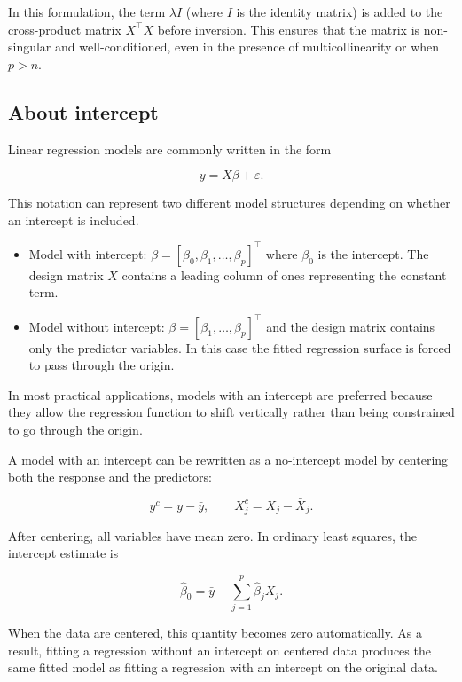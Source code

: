 \documentclass[
  letterpaper,
  DIV=11,
  numbers=noendperiod]{scrreprt}
\providecommand{\tightlist}{%
  \setlength{\itemsep}{0pt}\setlength{\parskip}{0pt}}
\theoremstyle{definition}
\theoremstyle{definition}
\theoremstyle{plain}
\theoremstyle{plain}
\theoremstyle{remark}
\begin{document}
In this formulation, the term \(\lambda I\) (where \(I\) is the identity
matrix) is added to the cross-product matrix \(X^\top X\) before
inversion. This ensures that the matrix is non-singular and
well-conditioned, even in the presence of multicollinearity or when
\(p > n\).

\subsection{About intercept}\label{about-intercept}

Linear regression models are commonly written in the form

\[
y = X\beta + \varepsilon.
\]

This notation can represent two different model structures depending on
whether an intercept is included.

\begin{itemize}
\tightlist
\item
  Model with intercept:
  \(\beta = [\beta_0,\beta_1,\ldots,\beta_p]^\top\) where \(\beta_0\) is
  the intercept. The design matrix \(X\) contains a leading column of
  ones representing the constant term.
\item
  Model without intercept: \(\beta = [\beta_1,\ldots,\beta_p]^\top\) and
  the design matrix contains only the predictor variables. In this case
  the fitted regression surface is forced to pass through the origin.
\end{itemize}

In most practical applications, models with an intercept are preferred
because they allow the regression function to shift vertically rather
than being constrained to go through the origin.

\begin{tcolorbox}[enhanced jigsaw, arc=.35mm, bottomrule=.15mm, bottomtitle=1mm, breakable, colback=white, colbacktitle=quarto-callout-note-color!10!white, colframe=quarto-callout-note-color-frame, coltitle=black, left=2mm, leftrule=.75mm, opacityback=0, opacitybacktitle=0.6, rightrule=.15mm, title=\textcolor{quarto-callout-note-color}{\faInfo}\hspace{0.5em}{Centering and the No-Intercept Form}, titlerule=0mm, toprule=.15mm, toptitle=1mm]

A model with an intercept can be rewritten as a no-intercept model by
centering both the response and the predictors:

\[
y^c = y - \bar y, 
\qquad
X_j^c = X_j - \bar X_j .
\]

After centering, all variables have mean zero. In ordinary least
squares, the intercept estimate is

\[
\hat\beta_0 = \bar y - \sum_{j=1}^{p}\hat\beta_j \bar X_j .
\]

When the data are centered, this quantity becomes zero automatically. As
a result, fitting a regression without an intercept on centered data
produces the same fitted model as fitting a regression with an intercept
on the original data.

\end{tcolorbox}
\end{document}
